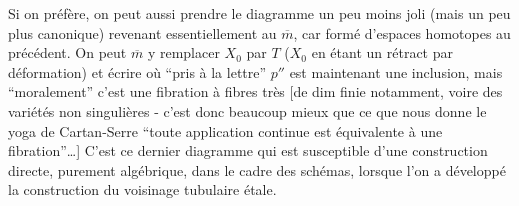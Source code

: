 Si on préfère, on peut aussi prendre le
diagramme un peu moins joli (mais un
peu plus canonique)
revenant essentiellement au $\overline m$, car formé d'espaces
homotopes au précédent. On peut $\overline m$ y remplacer
$X_0$ par $T$ ($X_0$ en étant un rétract par déformation) et écrire
%
où ``pris à la lettre'' $p''$ est maintenant une inclusion, mais ``moralement'' c'est  une fibration à fibres très  [de dim finie notamment, voire des variétés non singulières - c'est donc beaucoup mieux que ce que nous donne le yoga de Cartan-Serre ``toute application continue est équivalente à une fibration''\ldots] C'est ce dernier diagramme qui est susceptible d'une construction directe, purement algébrique, dans le cadre des schémas, lorsque l'on a développé la construction du voisinage tubulaire étale.

